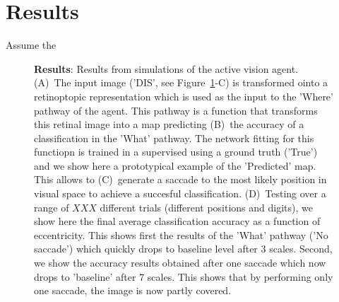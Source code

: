 \section{Results}
\label{sec:results}

Assume the 

\begin{figure}%
\caption{
{\bf Results}: Results from simulations of the active vision agent.
(A)~The input image ('DIS', see  Figure~\ref{fig:results}-C)  is transformed ointo a retinoptopic representation which is used as the input to the 'Where' pathway of the agent. This pathway is a function that transforms this retinal image into a map predicting (B)~the accuracy of a classification in the 'What' pathway. The network fitting for this functiopn is trained in a supervised using a ground truth ('True') and we show here a prototypical example of the 'Predicted' map. This allows to (C)~generate a saccade to the most likely position in visual space to achieve a succesful classification. (D)~Testing over a range of $XXX$ different trials (different positions and digits), we show here the final average classification accuracy as a function of eccentricity. This shows first the results of the 'What' pathway ('No saccade') which quickly drops to baseline level after 3 scales. Second, we show the accuracy results obtained after one saccade which now drops to 'baseline' after 7 scales. This shows that by performing only one saccade, the image is now partly covered.
\label{fig:results}}%
\end{figure}%




